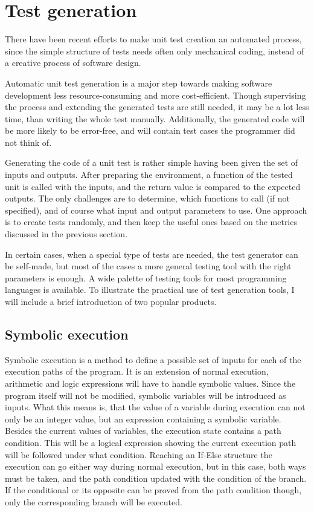 \section{Test generation}

There have been recent efforts to make unit test creation an automated process, since the simple structure of tests needs often only mechanical coding, instead of a creative process of software design. 

Automatic unit test generation is a major step towards making software development less resource-consuming and more cost-efficient. Though supervising the process and extending the generated tests are still needed, it may be a lot less time, than writing the whole test manually. Additionally, the generated code will be more likely to be error-free, and will contain test cases the programmer did not think of.

Generating the code of a unit test is rather simple having been given the set of inputs and outputs. After preparing the environment, a function of the tested unit is called with the inputs, and the return value is compared to the expected outputs. The only challenges are to determine, which functions to call (if not specified), and of course what input and output parameters to use. One approach is to create tests randomly, and then keep the useful ones based on the metrics discussed in the previous section.

In certain cases, when a special type of tests are needed, the test generator can be self-made, but most of the cases a more general testing tool with the right parameters is enough. A wide palette of testing tools for most programming languages is available. To illustrate the practical use of test generation tools, I will include a brief introduction of two popular products.


\subsection{Symbolic execution}

Symbolic execution is a method to define a possible set of inputs for each of the execution paths of the program. It is an extension of normal execution, arithmetic and logic expressions will have to handle symbolic values. Since the program itself will not be modified, symbolic variables will be introduced as inputs. What this means is, that the value of a variable during execution can not only be an integer value, but an expression containing a symbolic variable.
Besides the current values of variables, the execution state contains a path condition. This will be a logical expression showing the current execution path will be followed under what condition. Reaching an If-Else structure the execution can go either way during normal execution, but in this case, both ways must be taken, and the path condition updated with the condition of the branch. If the conditional or its opposite can be proved from the path condition though, only the corresponding branch will be executed. \cite{King:1976:SEP:360248.360252}

